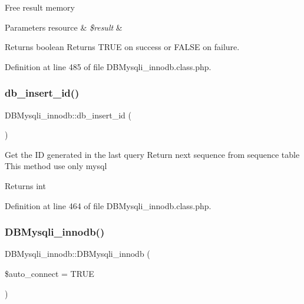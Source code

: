 Free result memory 
\begin{DoxyParams}[1]{Parameters}
resource & {\em \$result} & \\
\hline
\end{DoxyParams}
\begin{DoxyReturn}{Returns}
boolean Returns T\+R\+UE on success or F\+A\+L\+SE on failure. 
\end{DoxyReturn}


Definition at line 485 of file D\+B\+Mysqli\+\_\+innodb.\+class.\+php.

\hypertarget{classDBMysqli__innodb_aec47da41558bdf42e9d2fe31c2ce87f2}{}\label{classDBMysqli__innodb_aec47da41558bdf42e9d2fe31c2ce87f2} 
\subsubsection{\texorpdfstring{db\+\_\+insert\+\_\+id()}{db\_insert\_id()}}
{\footnotesize\ttfamily D\+B\+Mysqli\+\_\+innodb\+::db\+\_\+insert\+\_\+id (\begin{DoxyParamCaption}{ }\end{DoxyParamCaption})}

Get the ID generated in the last query Return next sequence from sequence table This method use only mysql \begin{DoxyReturn}{Returns}
int 
\end{DoxyReturn}


Definition at line 464 of file D\+B\+Mysqli\+\_\+innodb.\+class.\+php.

\hypertarget{classDBMysqli__innodb_a0802ef8a893610ae107ca25b77080bcc}{}\label{classDBMysqli__innodb_a0802ef8a893610ae107ca25b77080bcc} 
\subsubsection{\texorpdfstring{D\+B\+Mysqli\+\_\+innodb()}{DBMysqli\_innodb()}}
{\footnotesize\ttfamily D\+B\+Mysqli\+\_\+innodb\+::\+D\+B\+Mysqli\+\_\+innodb (\begin{DoxyParamCaption}\item[{}]{\$auto\+\_\+connect = {\ttfamily TRUE} }\end{DoxyParamCaption})}

